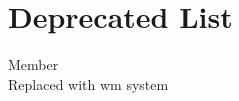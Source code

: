 \chapter{Deprecated List}
\label{deprecated}

\begin{DoxyRefList}
\item[Member \doxylink{enum_8hh_aa2f76535ef50e4e6dda6740929d1ed73}{game\+State} ]\hfill \\
\label{deprecated__deprecated000001}%
%
Replaced with wm system 
\end{DoxyRefList}